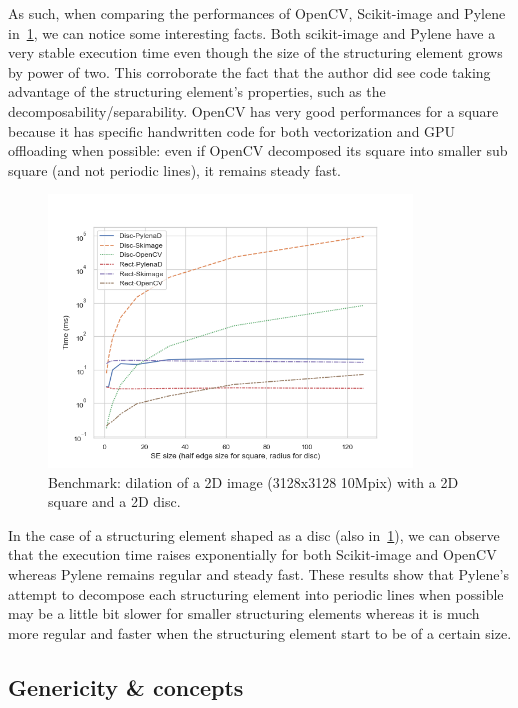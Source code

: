 As such, when comparing the performances of OpenCV, Scikit-image and Pylene in~\cref{fig.gen.bench.square.disc}, we can
notice some interesting facts. Both scikit-image and Pylene have a very stable execution time even though the size of
the structuring element grows by power of two. This corroborate the fact that the author did see code taking advantage
of the structuring element's properties, such as the decomposability/separability. OpenCV has very good performances for
a square because it has specific handwritten code for both vectorization and GPU offloading when possible: even if
OpenCV decomposed its square into smaller sub square (and not periodic lines), it remains steady fast.

\begin{figure}[htb]
  \centering
  \includegraphics[width=3.8in]{figs/bench_disc_rect_by_SE}
  \caption{Benchmark: dilation of a 2D image (3128x3128 \eqmark 10Mpix) with a 2D square and a 2D disc.}
  \label{fig.gen.bench.square.disc}
\end{figure}

In the case of a structuring element shaped as a disc (also in~\cref{fig.gen.bench.square.disc}), we can observe that
the execution time raises exponentially for both Scikit-image and OpenCV whereas Pylene remains regular and steady fast.
These results show that Pylene's attempt to decompose each structuring element into periodic lines when possible may be
a little bit slower for smaller structuring elements whereas it is much more regular and faster when the structuring
element start to be of a certain size.


\subsection*{Genericity \& concepts}
\label{subsec.gen.concept}


